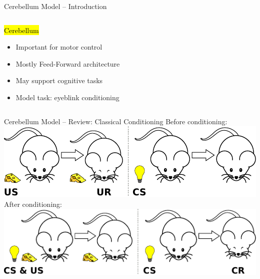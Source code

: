\documentclass[handout,aspectratio=169]{beamer}
\begin{document}
	\begin{frame}{Cerebellum Model -- Introduction}
		\begin{columns}[c]
			\begin{block}{\hl{Cerebellum}}
				\begin{itemize}
					\setlength{\itemsep}{0.5cm}
					\item Important for motor control
					\item Mostly Feed-Forward architecture
					\item May support cognitive tasks
					\item Model task: eyeblink conditioning
				\end{itemize}
			\end{block}
		\end{columns}
	\end{frame}

	\begin{frame}{Cerebellum Model -- Review: Classical Conditioning}
		\centering
		Before conditioning:\\[0.125cm]
		\includegraphics{media/classical_conditioning_a.pdf}\\[0.5cm]
		After conditioning:\\[0.125cm]
		\includegraphics{media/classical_conditioning_b.pdf}\\[0.5cm]
	\end{frame}
	
\end{document}
